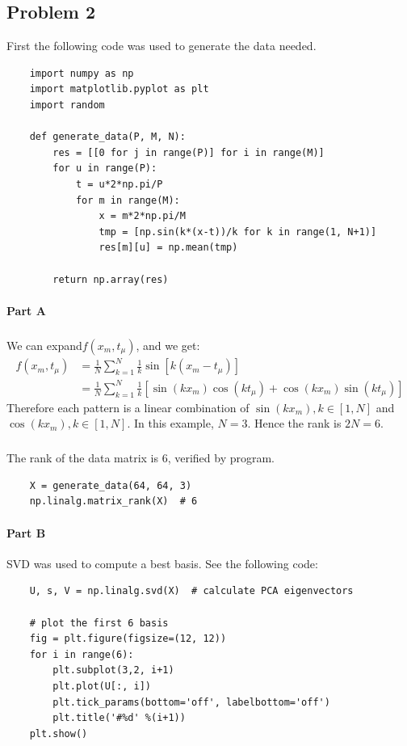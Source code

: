 \documentclass{article}
\begin{document}
	
\newpage
\subsection{Problem 2}
First the following code was used to generate the data needed. 
\begin{lstlisting}
	import numpy as np
	import matplotlib.pyplot as plt
	import random

	def generate_data(P, M, N):
		res = [[0 for j in range(P)] for i in range(M)]
		for u in range(P):
			t = u*2*np.pi/P
			for m in range(M):
				x = m*2*np.pi/M
				tmp = [np.sin(k*(x-t))/k for k in range(1, N+1)]
				res[m][u] = np.mean(tmp)
    
		return np.array(res)
\end{lstlisting}


\paragraph{Part A} 
\subparagraph{} We can expand$f(x_m, t_\mu)$, and we get:
\begin{align*}
f(x_m, t_\mu) &= \frac{1}{N}\sum_{k=1}^{N}\frac{1}{k}\sin[k(x_m - t_\mu)] \\
&= \frac{1}{N}\sum_{k=1}^{N}\frac{1}{k}[\sin(kx_m)\cos(kt_\mu) + \cos(kx_m)\sin(kt_\mu)]
\end{align*}
Therefore each pattern is a linear combination of $\sin(kx_m), k \in [1,N]$ and $\cos(kx_m), k \in [1,N]$. In this example, $N=3$. Hence the rank is $2N=6$. 
\subparagraph{} The rank of the data matrix is 6, verified by program.
\begin{lstlisting}
	X = generate_data(64, 64, 3)
	np.linalg.matrix_rank(X)  # 6
\end{lstlisting}


\paragraph{Part B} SVD was used to compute a best basis. See the following code:
\begin{lstlisting}
	U, s, V = np.linalg.svd(X)  # calculate PCA eigenvectors
	
	# plot the first 6 basis
	fig = plt.figure(figsize=(12, 12))
	for i in range(6):
		plt.subplot(3,2, i+1)
		plt.plot(U[:, i])
		plt.tick_params(bottom='off', labelbottom='off')
		plt.title('#%d' %(i+1))
	plt.show()
\end{lstlisting}
\end{document}
